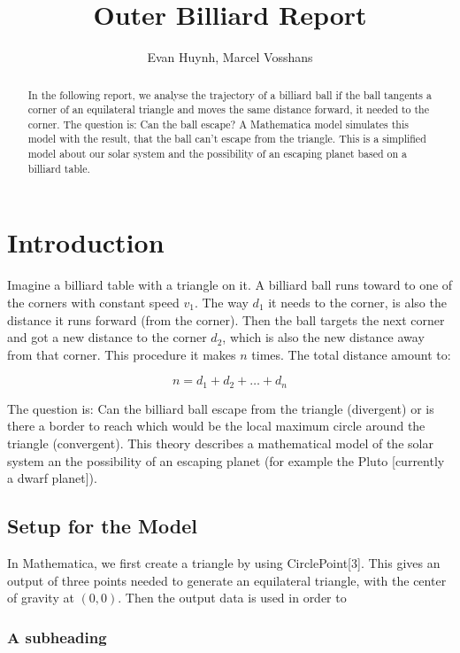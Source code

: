\documentclass[11pt,a4paper]{article}
\begin{document}
\title{Outer Billiard Report}
\author{Evan Huynh, Marcel Vosshans}
\maketitle

\begin{abstract}
In the following report, we analyse the trajectory of a billiard ball if the ball tangents a corner of an equilateral triangle and moves the same distance forward, it needed to the corner. The question is: Can the ball escape? A Mathematica model simulates this model with the result, that the ball can’t escape from the triangle. This is a simplified model about our solar system and the possibility of an escaping planet based on a billiard table.
\end{abstract}

\tableofcontents

\section{Introduction}
Imagine a billiard table with a triangle on it. A billiard ball runs toward to one of the corners with constant speed \(v_{1}\). The way \(d_{1}\) it needs to the corner, is also the distance it runs forward (from the corner). Then the ball targets the next corner and got a new distance to the corner \(d_{2}\), which is also the new distance away from that corner. This procedure it makes \(n\) times. The total distance amount to:

\[n=d_{1}+d_{2}+\dots+d_{n}\]

The question is: Can the billiard ball escape from the triangle (divergent) or is there a border to reach which would be the local maximum circle around the triangle (convergent). This theory describes a mathematical model of the solar system an the possibility of an escaping planet (for example the Pluto [currently a dwarf planet]).
	
\subsection{Setup for the Model}
In Mathematica, we first create a triangle by using CirclePoint[3]. This gives an output of three points needed to generate an equilateral triangle, with the center of gravity at \((0,0)\). Then the output data is used in order to 

\subsubsection{A subheading}
\end{document}
